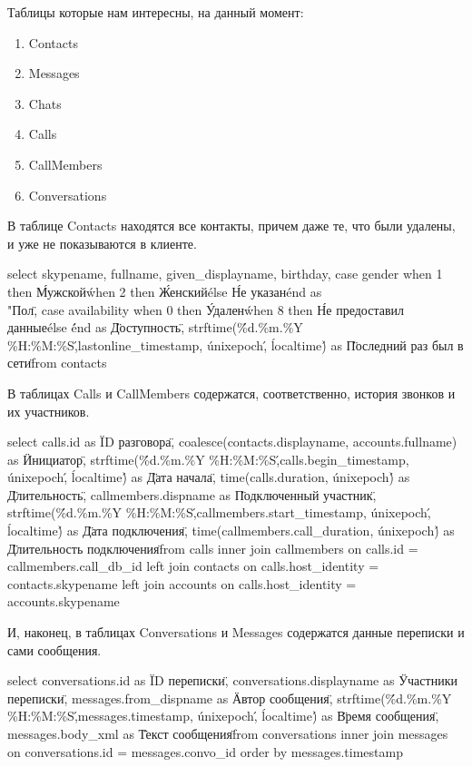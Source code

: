 Таблицы которые нам интересны, на данный момент:    
 \begin{enumerate}
\item Contacts
\item Messages
\item Chats
\item Calls
\item CallMembers
\item Conversations
\end{enumerate}

В таблице Contacts находятся все контакты, причем даже те, что были удалены, и уже не показываются в клиенте.

select skypename, 
       fullname, 
       given_displayname, 
       birthday, 
       case gender when 1 then \'Мужской\' when 2 then \'Женский\' else \'Не указан\' end as \\"Пол\", 
       case availability when 0 then \'Удален\' when 8 then \'Не предоставил данные\' else \'\' end as \"Доступность\",
       strftime(\'\%d.\%m.\%Y \%H:\%M:\%S\',lastonline_timestamp, \'unixepoch\', \'localtime\') as \"Последний раз был в сети\"
  from contacts



В таблицах Calls и CallMembers содержатся, соответственно, история звонков и их участников.

select calls.id as \"ID разговора\",
       coalesce(contacts.displayname, accounts.fullname) as \"Инициатор\",
       strftime(\'\%d.\%m.\%Y \%H:\%M:\%S\',calls.begin_timestamp, \'unixepoch\', \'localtime\') as \"Дата начала\",
       time(calls.duration, \'unixepoch\') as \"Длительность\",
       callmembers.dispname as \"Подключенный участник\",
       strftime(\'\%d.\%m.\%Y \%H:\%M:\%S\',callmembers.start_timestamp, \'unixepoch\', \'localtime\') as \"Дата подключения\",
       time(callmembers.call_duration, \'unixepoch\') as \"Длительность подключения\"
  from calls
       inner join callmembers on calls.id = callmembers.call_db_id
       left  join contacts on calls.host_identity = contacts.skypename
       left  join accounts on calls.host_identity = accounts.skypename



И, наконец, в таблицах Conversations и Messages содержатся данные переписки и сами сообщения.

select conversations.id as \"ID переписки\", 
       conversations.displayname as \"Участники переписки\", 
       messages.from_dispname as \"Автор сообщения\",  
       strftime(\'\%d.\%m.\%Y \%H:\%M:\%S\',messages.timestamp, \'unixepoch\', \'localtime\') as \"Время сообщения\", 
       messages.body_xml as \"Текст сообщения\"
  from conversations
       inner join messages on conversations.id = messages.convo_id
order by messages.timestamp



